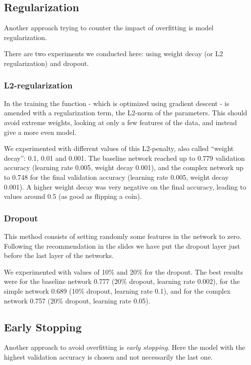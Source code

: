 \documentclass[sigconf,nonacm]{acmart}
\begin{document}
\subsection{Regularization}

Another approach trying to counter the impact of overfitting
is model regularization.

There are two experiments we conducted here:
using weight decay (or L2 regularization)
and dropout.

\subsubsection{L2-regularization}
In the training the function - which is optimized 
using gradient descent - is amended
with a regularization term, the L2-norm of the parameters.
This should avoid extreme weights, looking at only
a few features of the data, and instead give a more
even model.

We experimented with different values of this L2-penalty,
also called ``weight decay'': 0.1, 0.01 and 0.001.
The baseline network reached up to 0.779 validation
accuracy (learning rate 0.005, weight decay 0.001),
and the complex network up to 0.748 for the final
validation accuracy (learning rate 0.005, weight
decay 0.001).
A higher weight decay was very negative on the final
accuracy, leading to values around 0.5 (as good
as flipping a coin).

\subsubsection{Dropout}
This method consists
of setting randomly some features in the
network to zero.
Following the recommendation in the slides we have
put the dropout layer just before the last layer
of the networks.

We experimented with values of 10\% and 20\%
for the dropout.
The best results were for the baseline network
0.777 (20\% dropout, learning rate 0.002),
for the simple network 0.689 (10\% dropout, learning rate 0.1),
and for the complex network 0.757 (20\% dropout,
learning rate 0.05).

\subsection{Early Stopping}

Another approach to avoid overfitting is \emph{early stopping}.
Here the model with the highest validation accuracy is
chosen and not necessarily the last one.
\end{document}
